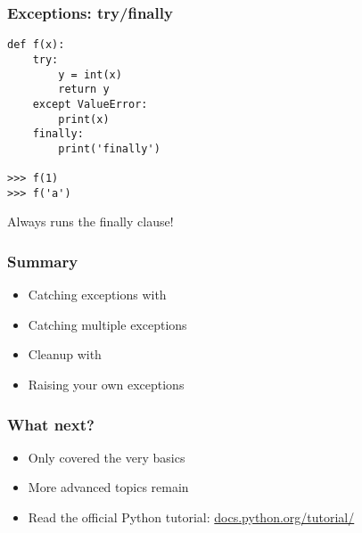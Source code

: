 \documentclass[14pt,compress]{beamer}
\begin{document}
\begin{frame}[fragile]
  \frametitle{Exceptions: try/finally}
  \begin{lstlisting}
def f(x):
    try:
        y = int(x)
        return y
    except ValueError:
        print(x)
    finally:
        print('finally')

>>> f(1)
>>> f('a')
\end{lstlisting}
Always runs the finally clause!
\end{frame}


\begin{frame}
  \frametitle{Summary}
  \begin{itemize}
  \item Catching exceptions with 
  \item Catching multiple exceptions
  \item Cleanup with 
  \item Raising your own exceptions
  \end{itemize}
\end{frame}

\begin{frame}
  \frametitle{What next?}
  \begin{itemize}
  \item Only covered the very basics
  \item More advanced topics remain
  \item Read the official Python tutorial:
    \url{docs.python.org/tutorial/}
  \end{itemize}
\end{frame}
\end{document}
